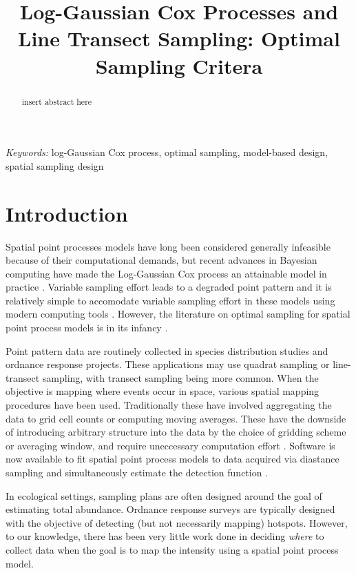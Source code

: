 \documentclass[12pt]{article}
\begin{document}
\title{\bf Log-Gaussian Cox Processes and Line Transect Sampling: Optimal Sampling Critera}

\author{}
\date{}        
\maketitle

\bigskip
\begin{abstract}

\noindent insert abstract here

\end{abstract}

{\it Keywords:} log-Gaussian Cox process, optimal sampling, model-based design, spatial sampling design

\linenumbers


\section{Introduction}

Spatial point processes models have long been considered generally infeasible
because of their computational demands, but recent advances in Bayesian
computing have made the Log-Gaussian Cox process an attainable model in
practice \cite{rueetal, lindgrenetal, illianetal, simpsonetal}. Variable
sampling effort leads to a degraded point pattern \cite{chakrabortyetal} and
it is relatively simple to accomodate variable sampling effort in these models
using modern computing tools \cite{yuanetal}. However, the literature on
optimal sampling for spatial point process models is in its infancy
\cite{liuvanhatalo}.

Point pattern data are routinely collected in species distribution studies and
ordnance response projects. These applications may use quadrat sampling or
line-transect sampling, with transect sampling being more common. When the
objective is mapping where events occur in space, various spatial mapping
procedures have been used. Traditionally these have involved aggregating the
data to grid cell counts or computing moving averages. These have the downside
of introducing arbitrary structure into the data by the choice of gridding
scheme or averaging window, and require uneccessary computation effort
\cite{simpsonetal}. Software is now available to fit spatial point process
models to data acquired via diastance sampling and simultaneously estimate the
detection function \cite{dspat}.

In ecological settings, sampling plans are often designed around the goal of
estimating total abundance. Ordnance response surveys are typically designed
with the objective of detecting (but not necessarily mapping) hotspots.
However, to our knowledge, there has been very little work done in deciding
\emph{where} to collect data when the goal is to map the intensity using a
spatial point process model.
\end{document}
